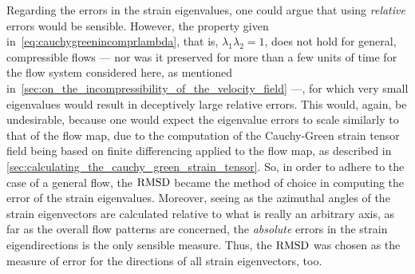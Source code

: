 %
Regarding the errors in the strain eigenvalues, one could argue that using
\emph{relative} errors would be sensible. However, the property
given in~\cref{eq:cauchygreenincomprlambda}, that is, $\lambda_{1}\lambda_{2}=1$,
does not hold for general, compressible flows --- nor was it preserved for
more than a few units of time for the flow system considered here, as mentioned
in~\cref{sec:on_the_incompressibility_of_the_velocity_field} ---, for which very
small eigenvalues would result in deceptively large relative errors.
This would, again, be undesirable, because one would expect the eigenvalue
errors to scale similarly to that of the flow map, due to the computation of
the Cauchy-Green strain tensor field being based on finite differencing applied
to the flow map, as described in
\cref{sec:calculating_the_cauchy_green_strain_tensor}. So, in order to adhere
to the case of a general flow, the $\operatorname{RMSD}$ became the method of choice in
computing the error of the strain eigenvalues. Moreover, seeing as the
azimuthal angles of the strain eigenvectors are calculated relative to what is
really an arbitrary axis, as far as the overall flow patterns are concerned, the
\emph{absolute} errors in the strain eigendirections is the only sensible
measure. Thus, the $\operatorname{RMSD}$ was chosen as the measure of error for the
directions of all strain eigenvectors, too.
%

